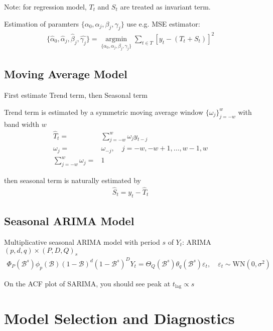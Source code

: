     Note: for regression model, $ T_t $ and $ S_t $ are treated as invariant term.

    Estimation of paramters $ \{\alpha _0,\alpha_j,\beta _j,\gamma _j\} $ use e.g. MSE estimator:
    \begin{align}
        \{\hat{\alpha }_0,\hat{\alpha }_j,\hat{\beta }_j,\hat{\gamma _j}\}=\mathop{\arg\min}\limits_{\{\alpha _0,\alpha_j,\beta _j,\gamma _j\}} \sum_{t\in T} \left[y_t-(T_t+S_t)\right]^2
    \end{align}


\subsection{Moving Average Model}
    First estimate Trend term, then Seasonal term

    Trend term is estimated by a symmetric moving average window $ \{\omega _j\}_{j=-w}^w $ with band width $ w $
    \begin{align}
        \hat{T}_t=&\sum_{j=-w}^w\omega _jy_{t-j}\\
        \omega _j=&\omega _{-j},\quad j=-w,-w+1,\ldots,w-1,w\\
        \sum_{j=-w}^w\omega _j=&1
    \end{align}
        
    then seasonal term is naturally estimated by 
    \begin{align}
        \hat{S}_t=y_t- \hat{T}_t
    \end{align}
    
\subsection{Seasonal ARIMA Model}\label{SubSubSectionSARIMA}
    Multiplicative seasonal ARIMA model with period $ s $ of $ Y_t $: ARIMA$ (p,d,q)\times (P,D,Q)_s $
    \begin{align}
        \Phi _P(\mathscr{B} ^s)\phi _p(\mathscr{B} )(1-\mathscr{B} )^d(1-\mathscr{B} ^s)^DY_t=\Theta _Q(\mathscr{B} ^s)\theta _q(\mathscr{B} ^s)\varepsilon _t,\quad \varepsilon _t\sim \mathrm{WN}(0,\sigma ^2) 
    \end{align} 

    On the ACF plot of SARIMA, you should see peak at $ t_\mathrm{lag}\propto s  $
    
\section{Model Selection and Diagnostics}
